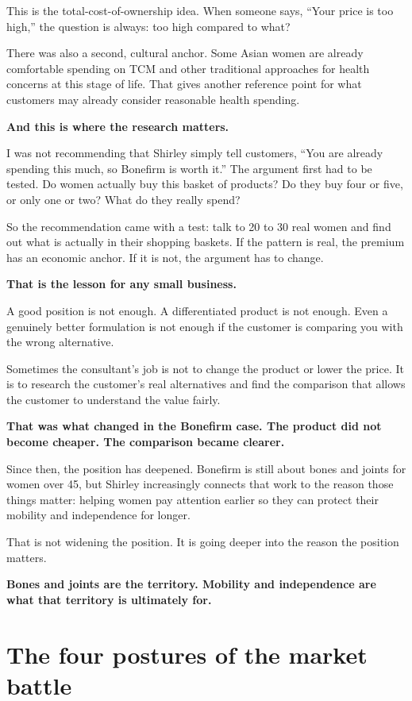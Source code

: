 \documentclass[10pt,twoside,openany]{memoir}
\newcommand{\needspacehead}{\needspace{4\baselineskip}}
\let\oldsection\section
\renewcommand{\section}{\needspacehead\oldsection}
\begin{document}
{This is the total-cost-of-ownership idea. When someone says, ``Your
price is too high,'' the question is always: too high compared to what?

There was also a second, cultural anchor. Some Asian women are already
comfortable spending on TCM and other traditional approaches for health
concerns at this stage of life. That gives another reference point for
what customers may already consider reasonable health spending.

\textbf{And this is where the research matters.}

I was not recommending that Shirley simply tell customers, ``You are
already spending this much, so Bonefirm is worth it.'' The argument
first had to be tested. Do women actually buy this basket of products?
Do they buy four or five, or only one or two? What do they really spend?

So the recommendation came with a test: talk to 20 to 30 real women and
find out what is actually in their shopping baskets. If the pattern is
real, the premium has an economic anchor. If it is not, the argument has
to change.

\textbf{That is the lesson for any small business.}

A good position is not enough. A differentiated product is not enough.
Even a genuinely better formulation is not enough if the customer is
comparing you with the wrong alternative.

Sometimes the consultant's job is not to change the product or lower the
price. It is to research the customer's real alternatives and find the
comparison that allows the customer to understand the value fairly.

\textbf{That was what changed in the Bonefirm case. The product did not
become cheaper. The comparison became clearer.}

Since then, the position has deepened. Bonefirm is still about bones and
joints for women over 45, but Shirley increasingly connects that work to
the reason those things matter: helping women pay attention earlier so
they can protect their mobility and independence for longer.

That is not widening the position. It is going deeper into the reason
the position matters.

\textbf{Bones and joints are the territory. Mobility and independence
are what that territory is ultimately for.}

\section{The four postures of the market
battle}\label{the-four-postures-of-the-market-battle}

}
\end{document}

